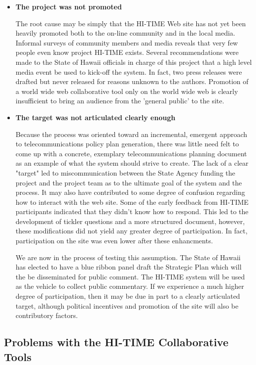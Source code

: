 \begin{itemize}
\item {\bf The project was not promoted}

The root cause may be simply that the HI-TIME Web site has not yet been heavily
promoted both to the on-line community and in the local media.  Informal
surveys of community members and media reveals that very few people even
know project HI-TIME exists.  Several recommendations were made to the
State of Hawaii officials in charge of this project that a high level media
event be used to kick-off the system.  In fact, two press releases were
drafted but never released for reasons unknown to the authors. Promotion of
a world wide web collaborative tool only on the world wide web is clearly
insufficient to bring an audience from the 'general public' to the site.

\item {\bf The target was not articulated clearly enough}

Because the process was oriented toward an incremental, emergent approach
to telecommunications policy plan generation, there was little need felt
to come up with a concrete, exemplary telecommunications planning
document as an example of what the system should strive to create.  The
lack of a clear "target" led to miscommunication between the State
Agency funding the project and the project team as to the ultimate goal
of the system and the process.  It may also have contributed to some degree
of confusion regarding how to interact with the web site.  Some of the
early feedback from HI-TIME participants indicated that they
didn't know how to respond.  This led to the development of tickler
questions and a more structured document, however, these modifications did
not yield any greater degree of participation.  In fact, participation on
the site was even lower after these enhancments.

We are now in the process of testing this assumption.  The State of
Hawaii has elected to have a blue ribbon panel draft the Strategic Plan
which will the be disseminated for public comment.  The HI-TIME system will
be used as the vehicle to collect public commentary.  If we experience a
much higher degree of participation, then it may be due in part to a
clearly articulated target, although political incentives and promotion of
the site will also be contributory factors.

\end{itemize}

\subsection{Problems with the HI-TIME Collaborative Tools}

